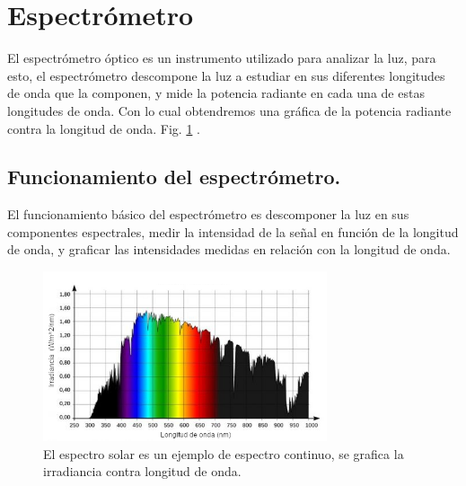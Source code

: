 \section{Espectrómetro}
El espectrómetro óptico es un instrumento utilizado para analizar la luz, para esto, el espectrómetro descompone la luz a estudiar en sus diferentes longitudes de onda que la componen, y mide la potencia radiante en cada una de estas longitudes de onda. Con lo cual obtendremos una gráfica de la potencia radiante contra la longitud de onda. Fig. \ref{fig:espectrosol} \cite{B&WTek2016}. 

\subsection{Funcionamiento del espectrómetro.}
El funcionamiento básico del espectrómetro es descomponer la luz en sus componentes espectrales, medir la intensidad de la señal en función de la longitud de onda, y graficar las intensidades medidas en relación con la longitud de onda. 
\begin{figure}[h!]
	\centering
	\includegraphics[width=0.9\linewidth,height=5cm]{Imagenes/espectroSOL}
	\caption[Espectro continuo, luz solar \cite{SolarLight}.]{El espectro solar es un ejemplo de espectro continuo, se grafica la irradiancia contra longitud de onda.}
	\label{fig:espectrosol}
\end{figure}

